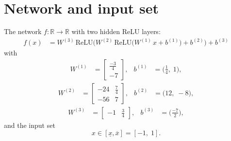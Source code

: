 \documentclass[11pt]{article}
\begin{document}
\section{Network and input set}
The network $f:\mathbb{R} \to \mathbb{R}$ with two hidden ReLU layers:
\begin{align*}
f(x) &= W^{(3)}\,\mathrm{ReLU}\bigl(W^{(2)}\,\mathrm{ReLU}\bigl(W^{(1)}\,x + b^{(1)}\bigr) + b^{(2)}\bigr) + b^{(3)}
\end{align*}
with
\begin{align*}
W^{(1)} &= \begin{bmatrix}
\frac{-3}{4} \\
-7
\end{bmatrix}, & b^{(1)} &= \bigl(\frac{1}{4},\; 1\bigr),
\end{align*}
\begin{align*}
W^{(2)} &= \begin{bmatrix}
-24 & \frac{7}{4} \\
-56 & 7
\end{bmatrix}, & b^{(2)} &= \bigl(12,\; -8\bigr),
\end{align*}
\begin{align*}
W^{(3)} &= \begin{bmatrix}
-1 & \frac{3}{4}
\end{bmatrix}, & b^{(3)} &= \bigl(\frac{-7}{2}\bigr),
\end{align*}
and the input set
\begin{equation*}
 x \in [\underline{x}, \overline{x}] = [-1,\; 1].
\end{equation*}
\end{document}

